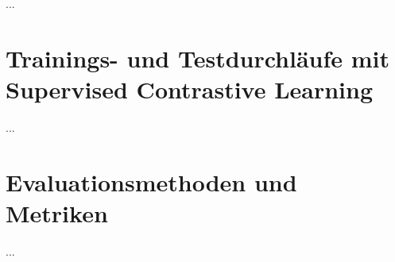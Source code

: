 ...

\section{Trainings- und Testdurchläufe mit Supervised Contrastive Learning} \label{sec:train-test-supcon}

...

\section{Evaluationsmethoden und Metriken} \label{sec:evaluation}

...